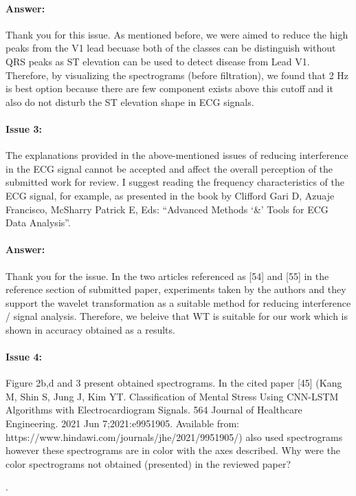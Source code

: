 \documentclass{article}
\begin{document}
\paragraph{Answer:}
Thank you for this issue. As mentioned before, we were aimed to reduce the high peaks from the V1 lead becuase both of the classes can be distinguish without QRS peaks as ST elevation can be used to detect disease from Lead V1. Therefore, by visualizing the spectrograms (before filtration), we found that 2 Hz is best option because there are few component exists above this cutoff and it also do not disturb the ST elevation shape in ECG signals. 

\paragraph{Issue 3:}
\begin{displayquote}
The explanations provided in the above-mentioned issues of reducing interference in the ECG signal cannot be accepted and affect the overall perception of the submitted work for review. I suggest reading the frequency characteristics of the ECG signal, for example, as presented in the book by Clifford Gari D, Azuaje Francisco, McSharry Patrick E, Eds: ``Advanced Methods `\&' Tools for ECG Data Analysis''.
\end{displayquote}

\paragraph{Answer:}
Thank you for the issue. In the two articles referenced as [54] and [55] in the reference section of submitted paper, experiments taken by the authors and they support the wavelet transformation as a suitable method for reducing interference / signal analysis. Therefore, we beleive that WT is suitable for our work which is shown in accuracy obtained as a results.

\paragraph{Issue 4:}
\begin{displayquote}
Figure 2b,d and 3 present obtained spectrograms. In the cited paper [45] (Kang M, Shin S, Jung J, Kim YT. Classification of Mental Stress Using CNN-LSTM Algorithms with Electrocardiogram Signals. 564 Journal of Healthcare Engineering. 2021 Jun 7;2021:e9951905. Available from: https://www.hindawi.com/journals/jhe/2021/9951905/) also used spectrograms however these spectrograms are in color with the axes described. Why were the color spectrograms not obtained (presented) in the reviewed paper? 
\end{displayquote}.
\end{document}
